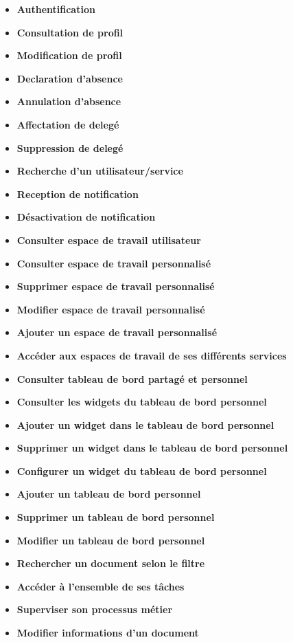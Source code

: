 \begin{itemize}
\item \textbf{Authentification}
\item \textbf{Consultation de profil}
\item \textbf{Modification de profil}
\item \textbf{Declaration d'absence}
\item \textbf{Annulation d'absence}
\item \textbf{Affectation de delegé}
\item \textbf{Suppression de delegé}
\item \textbf{Recherche d'un utilisateur/service}
\item \textbf{Reception de notification}
\item \textbf{Désactivation de notification}
\item \textbf{Consulter espace de travail utilisateur}
\item \textbf{Consulter espace de travail personnalisé}
\item \textbf{Supprimer espace de travail personnalisé}
\item \textbf{Modifier espace de travail personnalisé}
\item \textbf{Ajouter un espace de travail personnalisé}
\item \textbf{Accéder aux espaces de travail de ses différents services}
\item \textbf{Consulter tableau de bord partagé et personnel}
\item \textbf{Consulter les widgets du tableau de bord personnel}
\item \textbf{Ajouter un widget dans le tableau de bord personnel}
\item \textbf{Supprimer un widget dans le tableau de bord personnel}
\item \textbf{Configurer un widget du tableau de bord personnel}
\item \textbf{Ajouter un tableau de bord personnel}
\item \textbf{Supprimer un tableau de bord personnel}
\item \textbf{Modifier un tableau de bord personnel}
\item \textbf{Rechercher un document selon le filtre}
\item \textbf{Accéder à l'ensemble de ses tâches}
\item \textbf{Superviser son processus métier}
\item \textbf{Modifier informations d'un document}

\end{itemize}
